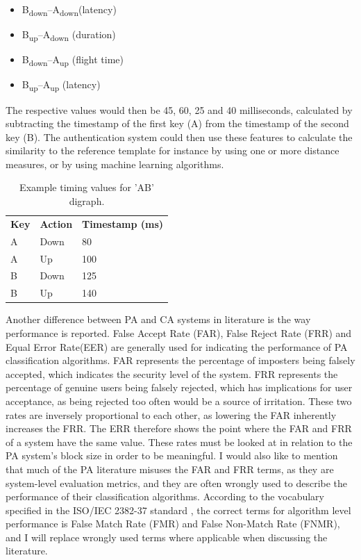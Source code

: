 \documentclass[informationsecurity]{gucmasterproject}
\begin{document}
\begin{itemize}
\item B\textsubscript{down}--A\textsubscript{down}(latency)
\item B\textsubscript{up}--A\textsubscript{down} (duration)
\item B\textsubscript{down}--A\textsubscript{up} (flight time)
\item B\textsubscript{up}--A\textsubscript{up} (latency)
\end{itemize}
The respective values would then be 45, 60, 25 and 40 milliseconds, calculated by subtracting the timestamp of the first key (A) from the timestamp of the second key (B).
The authentication system could then use these features to calculate the similarity to the reference template for instance by using one or more distance measures, or by using machine learning algorithms.

\begin{table}[h]
    \centering
    \begin{tabular}{lll}
         \bf Key & \bf Action & \bf Timestamp (ms)\\
         A & Down & 80\\
         A & Up & 100\\
         B & Down & 125\\
         B & Up & 140
    \end{tabular}
    \caption{Example timing values for 'AB' digraph.}
    \label{tab:timing-example}
\end{table}

Another difference between PA and CA systems in literature is the way performance is reported.
False Accept Rate (FAR), False Reject Rate (FRR) and Equal Error Rate(EER) are generally used for indicating the performance of PA classification algorithms.
FAR represents the percentage of imposters being falsely accepted, which indicates the security level of the system. 
FRR represents the percentage of genuine users being falsely rejected, which has implications for user acceptance, as being rejected too often would be a source of irritation.
These two rates are inversely proportional to each other, as lowering the FAR inherently increases the FRR.
The ERR therefore shows the point where the FAR and FRR of a system have the same value.
These rates must be looked at in relation to the PA system's block size in order to be meaningful.
I would also like to mention that much of the PA literature misuses the FAR and FRR terms, as they are system-level evaluation metrics, and they are often wrongly used to describe the performance of their classification algorithms.
According to the vocabulary specified in the ISO/IEC 2382-37 standard \cite{ISO-voc}, the correct terms for algorithm level performance is False Match Rate (FMR) and False Non-Match Rate (FNMR), and I will replace wrongly used terms where applicable when discussing the literature.
\end{document}
